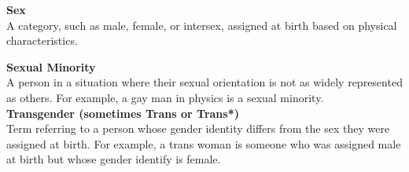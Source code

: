 \begin{titlepage}
\noindent\textbf{Sex}\\
A category, such as male, female, or intersex, assigned at birth based on physical characteristics.\vspace*{\baselineskip}

\noindent\textbf{Sexual Minority}\\
A person in a situation where their sexual orientation is not as widely represented as others. For example, a gay man in physics is a sexual minority. \\ %

\noindent\textbf{Transgender (sometimes Trans or Trans*)}\\
Term referring to a person whose gender identity differs from the sex they were assigned at birth.  For example, a trans woman is someone who was assigned male at birth but whose gender identify is female. %

%

%

\end{titlepage}









